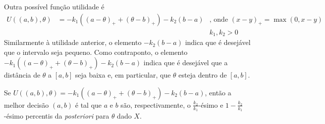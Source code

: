 Outra possível função utilidade é
\begin{align*}
 U((a,b),\theta)
 &= -k_{1}((a-\theta)_{+} +(\theta-b)_{+}) -k_{2}(b-a)
 & \text{, onde } (x-y)_{+} = \max(0,x-y) \\
 && k_{1},k_{2} > 0
\end{align*}
Similarmente à utilidade anterior, 
o elemento $-k_{2}(b-a)$ indica que 
é desejável que o intervalo seja pequeno.
Como contraponto, o elemento 
$-k_{1}((a-\theta)_{+} + (\theta-b)_{+}) -k_{2}(b-a)$
indica que é desejável que 
a distância de $\theta$ a $[a,b]$ seja baixa e,
em particular, que $\theta$ esteja dentro de $[a,b]$.
\begin{theorem}
 \label{thm:credible_interval_2}
 Se $U((a,b),\theta) =-k_{1}((a-\theta)_{+} + (\theta-b)_{+}) -k_{2}(b-a)$, então
 a melhor decisão $(a,b)$ é tal que 
 $a$ e $b$ são, respectivamente, o 
 $\frac{k_{2}}{k_{1}}$-ésimo
 e $1-\frac{k_2}{k_1}$-ésimo 
 percentis da \emph{posteriori} para $\theta$ dado $X$.
\end{theorem}
